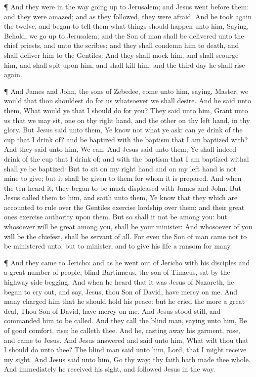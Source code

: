  ¶ And they were in the way going up to Jerusalem; and
Jesus went before them: and they were amazed; and as they followed, they
were afraid. And he took again the twelve, and began to tell them what
things should happen unto him,  Saying, Behold, we go up to
Jerusalem; and the Son of man shall be delivered unto the chief priests,
and unto the scribes; and they shall condemn him to death, and shall
deliver him to the Gentiles:  And they shall mock him, and
shall scourge him, and shall spit upon him, and shall kill him: and the
third day he shall rise again.

 ¶ And James and John, the sons of Zebedee, come unto him,
saying, Master, we would that thou shouldest do for us whatsoever we
shall desire.  And he said unto them, What would ye that I
should do for you?  They said unto him, Grant unto us that
we may sit, one on thy right hand, and the other on thy left hand, in
thy glory.  But Jesus said unto them, Ye know not what ye
ask: can ye drink of the cup that I drink of? and be baptized with the
baptism that I am baptized with?  And they said unto him,
We can. And Jesus said unto them, Ye shall indeed drink of the cup that
I drink of; and with the baptism that I am baptized withal shall ye be
baptized:  But to sit on my right hand and on my left hand
is not mine to give; but it shall be given to them for whom it is
prepared.  And when the ten heard it, they began to be much
displeased with James and John.  But Jesus called them to
him, and saith unto them, Ye know that they which are accounted to rule
over the Gentiles exercise lordship over them; and their great ones
exercise authority upon them.  But so shall it not be among
you: but whosoever will be great among you, shall be your minister:
 And whosoever of you will be the chiefest, shall be
servant of all.  For even the Son of man came not to be
ministered unto, but to minister, and to give his life a ransom for
many.

 ¶ And they came to Jericho: and as he went out of Jericho
with his disciples and a great number of people, blind Bartimæus, the
son of Timæus, sat by the highway side begging.  And when
he heard that it was Jesus of Nazareth, he began to cry out, and say,
Jesus, thou Son of David, have mercy on me.  And many
charged him that he should hold his peace: but he cried the more a great
deal, Thou Son of David, have mercy on me.  And Jesus stood
still, and commanded him to be called. And they call the blind man,
saying unto him, Be of good comfort, rise; he calleth thee.
 And he, casting away his garment, rose, and came to Jesus.
 And Jesus answered and said unto him, What wilt thou that
I should do unto thee? The blind man said unto him, Lord, that I might
receive my sight.  And Jesus said unto him, Go thy way; thy
faith hath made thee whole. And immediately he received his sight, and
followed Jesus in the way.

